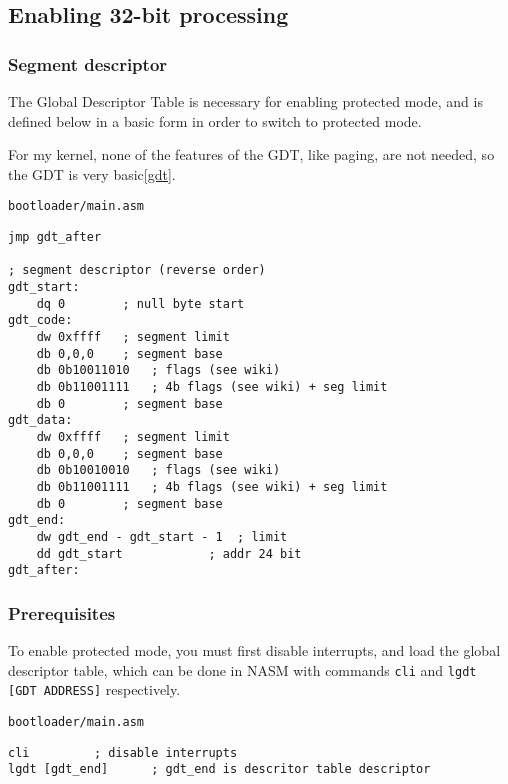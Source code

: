 \documentclass{article}
\begin{document}
\subsection{Enabling 32-bit processing}

\subsubsection{Segment descriptor}

The Global Descriptor Table is necessary for enabling protected mode\cite{gdt},
and is defined below in a basic form in order to switch to protected mode.

For my kernel, none of the features of the GDT, like paging\cite{gdt page},
are not needed, so the GDT is very basic\ref{gdt}.

\begin{verbatim}
bootloader/main.asm
\end{verbatim}
\begin{verbatim}
jmp gdt_after

; segment descriptor (reverse order)
gdt_start:
	dq 0		; null byte start
gdt_code:
	dw 0xffff	; segment limit
	db 0,0,0	; segment base
	db 0b10011010	; flags (see wiki)
	db 0b11001111	; 4b flags (see wiki) + seg limit
	db 0		; segment base
gdt_data:
	dw 0xffff	; segment limit
	db 0,0,0	; segment base
	db 0b10010010	; flags (see wiki)
	db 0b11001111	; 4b flags (see wiki) + seg limit
	db 0		; segment base
gdt_end:
	dw gdt_end - gdt_start - 1	; limit
	dd gdt_start			; addr 24 bit
gdt_after:
\end{verbatim}

\subsubsection{Prerequisites}

To enable protected mode, you must first disable interrupts,
and load the global descriptor table\cite{intel protected mode enable},
which can be done in NASM with commands \verb|cli| and \verb|lgdt [GDT ADDRESS]| respectively.

\begin{verbatim}
bootloader/main.asm
\end{verbatim}
\begin{verbatim}
cli			; disable interrupts
lgdt [gdt_end]		; gdt_end is descritor table descriptor
\end{verbatim}
\end{document}
